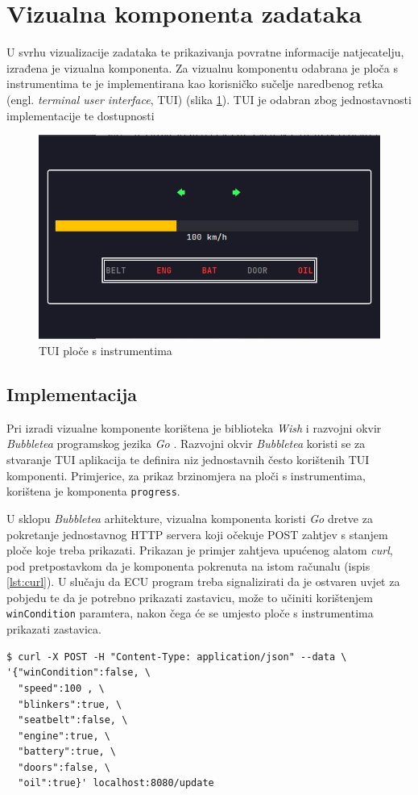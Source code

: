 \documentclass[times, utf8, diplomski, numeric]{fer}
\begin{document}
\section{Vizualna komponenta zadataka}
U svrhu vizualizacije zadataka te prikazivanja povratne informacije natjecatelju, izrađena je vizualna komponenta. Za vizualnu komponentu odabrana je ploča s instrumentima te je implementirana kao korisničko sučelje naredbenog retka (engl. \textit{terminal user interface}, TUI) (slika \ref{fig:ictui}). TUI je odabran zbog jednostavnosti implementacije te dostupnosti 
\begin{figure}[htb]
\centering
\includegraphics[width=\textwidth]{ictui.png}
\caption{TUI ploče s instrumentima}
\label{fig:ictui}
\end{figure}
\subsection{Implementacija}
Pri izradi vizualne komponente korištena je biblioteka \textit{Wish} i razvojni okvir \textit{Bubbletea} programskog jezika \textit{Go} \cite{wish, bubbletea}. Razvojni okvir \textit{Bubbletea} koristi se za stvaranje TUI aplikacija te definira niz jednostavnih često korištenih TUI komponenti. Primjerice, za prikaz brzinomjera na ploči s instrumentima, korištena je komponenta \texttt{progress}.

U sklopu \textit{Bubbletea} arhitekture, vizualna komponenta koristi \textit{Go} dretve  za pokretanje jednostavnog HTTP servera koji očekuje POST zahtjev s stanjem ploče koje treba prikazati. Prikazan je primjer zahtjeva upućenog alatom \textit{curl}, pod pretpostavkom da je komponenta pokrenuta na istom računalu (ispis \ref{lst:curl}). U slučaju da ECU program treba signalizirati da je ostvaren uvjet za pobjedu te da je potrebno prikazati zastavicu, može to učiniti korištenjem \texttt{winCondition} paramtera, nakon čega će se umjesto ploče s instrumentima prikazati zastavica.
\bigskip
\begin{lstlisting}[style=terminal, label={lst:curl},caption={Primjer POST zahtjeva sa stanjem ploče s instrumentima}]
$ curl -X POST -H "Content-Type: application/json" --data \
'{"winCondition":false, \ 
  "speed":100 , \ 
  "blinkers":true, \
  "seatbelt":false, \
  "engine":true, \
  "battery":true, \
  "doors":false, \ 
  "oil":true}' localhost:8080/update
\end{lstlisting}
\end{document}
